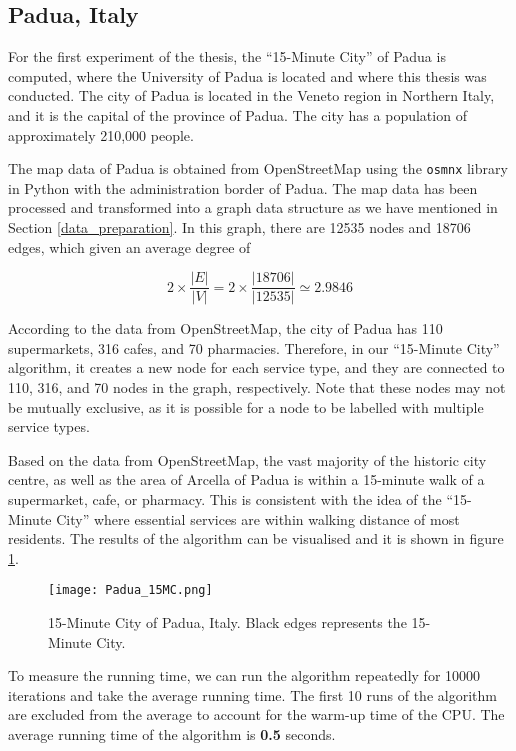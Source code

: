 \subsection{Padua, Italy}

For the first experiment of the thesis, the ``15-Minute City'' of Padua is computed, where the University of Padua is located and where this thesis was conducted. The city of Padua is located in the Veneto region in Northern Italy, and it is the capital of the province of Padua. The city has a population of approximately 210,000 people.

The map data of Padua is obtained from OpenStreetMap using the \verb|osmnx| library in Python with the administration border of Padua. The map data has been processed and transformed into a graph data structure as we have mentioned in Section \ref{data_preparation}. In this graph, there are 12535 nodes and 18706 edges, which given an average degree of

$$2\times\frac{|E|}{|V|}=2\times\frac{|18706|}{|12535|}\simeq2.9846$$

According to the data from OpenStreetMap, the city of Padua has 110 supermarkets, 316 cafes, and 70 pharmacies. Therefore, in our ``15-Minute City'' algorithm, it creates a new node for each service type, and they are connected to 110, 316, and 70 nodes in the graph, respectively. Note that these nodes may not be mutually exclusive, as it is possible for a node to be labelled with multiple service types.

Based on the data from OpenStreetMap, the vast majority of the historic city centre, as well as the area of Arcella of Padua is within a 15-minute walk of a supermarket, cafe, or pharmacy. This is consistent with the idea of the ``15-Minute City'' where essential services are within walking distance of most residents. The results of the algorithm can be visualised and it is shown in figure \ref{fig:padua_15MC}.

\begin{figure}[htbp]
    \centering
    \texttt{[image: Padua\_15MC.png]}
    \caption{15-Minute City of Padua, Italy. Black edges represents the 15-Minute City.}
    \label{fig:padua_15MC}
\end{figure}


To measure the running time, we can run the algorithm repeatedly for 10000 iterations and take the average running time. The first 10 runs of the algorithm are excluded from the average to account for the warm-up time of the CPU. The average running time of the algorithm is \textbf{0.5} seconds.

